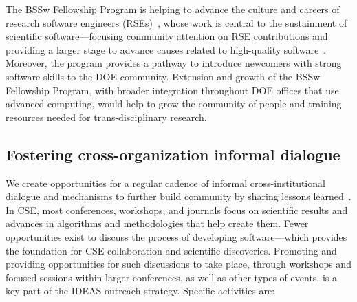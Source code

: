 \begin{itemize}
The BSSw Fellowship Program is helping to advance the culture and careers of research software engineers (RSEs)~\cite{us-rse-webpage}, whose work is central to the sustainment of scientific software---focusing community attention on RSE contributions and providing a larger stage to advance causes related to high-quality software~\cite{GodoyEtAl-CiSE2022}. Moreover, the program provides a pathway to introduce newcomers with strong software skills to the DOE community.  Extension and growth of the BSSw Fellowship Program, with broader integration throughout DOE offices that use advanced computing, would help to grow the community of people and training resources needed for trans-disciplinary research.

\end{itemize}

\subsection*{Fostering cross-organization informal dialogue} 
We create opportunities for a regular cadence of informal cross-institutional dialogue and mechanisms to further build community by sharing lessons learned~\cite{bernholdt_ideas_outreach_blog2018}. 
In CSE, most conferences, workshops, and journals focus on scientific results and advances in algorithms and methodologies that help create them. Fewer opportunities exist to discuss the process of developing software---which provides the foundation for CSE collaboration and scientific discoveries. Promoting and providing opportunities for such discussions to take place, through workshops and focused sessions within larger conferences, as well as other types of events, is a key part of the IDEAS outreach strategy. 
Specific activities are: 

